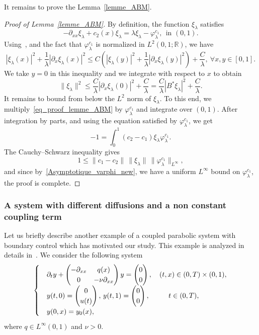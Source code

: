 \documentclass[10pt]{amsart}
\theoremstyle{definition}\newtheorem{defi}[theo]{Definition}\newtheorem{rema}[theo]{Remark}\newtheorem{exam}[theo]{Example}\newtheorem{exem}[theo]{Example}\newtheorem{nota}[theo]{Notation}
\newcommand{\fprop}[2]{\varphi^{#1}_{#2}}
\newcommand{\R}{\mathbb{R}}
\let\oldforall\forall
\renewcommand*{\forall}{\mathrel{\oldforall}}
\begin{document}
It remains to prove the Lemma~\ref{lemme_ABM}.
\begin{proof}[Proof of Lemma~\ref{lemme_ABM}]
By definition, the function $\xi_\lambda$ satisfies
\begin{equation}\label{eq_proof_lemme_ABM}
-\partial_{xx}\xi_\lambda + c_2(x) \xi_\lambda = \lambda \xi_\lambda - \fprop{c_1}{\lambda}, \ \ \text{in $(0,1)$}.
\end{equation}
Using~\cite[Lemmas~2.2 and 2.3]{ABM_2018}, and the fact that $\fprop{c_1}{\lambda}$ is normalized in $L^2(0,1;\R)$, we have
\[
|\xi_\lambda(x)|^2 + \frac{1}{\lambda} |\partial_x \xi_\lambda(x)|^2 \leq C \left(|\xi_\lambda(y)|^2 + \frac{1}{\lambda} |\partial_x \xi_\lambda(y)|^2\right) + \frac{C}{\lambda}, \ \forall x,y\in [0,1].
\]
We take $y=0$ in this inequality and we integrate with respect to $x$ to obtain
\[
\|\xi_\lambda\|^2 \leq \frac{C}{\lambda} |\partial_x \xi_\lambda(0)|^2 + \frac{C}{\lambda} = \frac{C}{\lambda} |B^*\xi_\lambda|^2 + \frac{C}{\lambda}.
\]
It remains to bound from below the $L^2$ norm of $\xi_\lambda$. To this end, we multiply~\eqref{eq_proof_lemme_ABM} by $\fprop{c_1}{\lambda}$ and integrate over $(0,1)$. After integration by parts, and using the equation satisfied by $\fprop{c_1}{\lambda}$, we get
\[
-1 = \int_0^1 (c_2-c_1) \xi_\lambda \fprop{c_1}{\lambda}.
\]
The Cauchy--Schwarz inequality gives
\[
1\leq \|c_1-c_2\|\,\|\xi_\lambda\|\,\|\fprop{c_1}{\lambda}\|_{L^\infty},
\]
and since by~\eqref{Asymptotique_varphi_new}, we have a uniform $L^\infty$ bound on $\fprop{c_1}{\lambda}$, the proof is complete.
\end{proof}

\subsubsection{A system with different diffusions and a non constant coupling term}

Let us briefly describe another example of a coupled parabolic system with boundary control which has motivated our study. This example is analyzed in details in~\cite{Samb18}. We consider the following system
\begin{equation}\label{systeme_elhadji}
\begin{cases}
& \partial_t y +
\begin{pmatrix} - \partial_{xx} & q(x) \\ 0 & - \nu \partial_{xx}
\end{pmatrix} y =
\begin{pmatrix} 0 \\ 0
\end{pmatrix},
\quad (t,x) \in (0,T) \times (0,1),
\\
&y(t,0) =
\begin{pmatrix} 0 \\ u(t)
\end{pmatrix},\, y(t,1) =
\begin{pmatrix} 0 \\ 0
\end{pmatrix}, \mkern 48mu t\in (0,T),
\\[0.15em]
&y(0,x) = y_0(x),
\end{cases}
\end{equation}
where $q\in L^\infty(0,1)$ and $\nu>0$.
\end{document}
